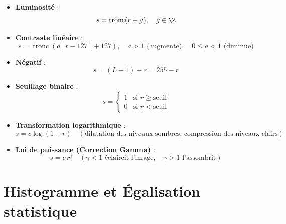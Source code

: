 \begin{proposition}
    \begin{itemize}
        \item \textbf{Luminosité} :
            \begin{equation}
                s = \operatorname{tronc}(r + g), \quad g \in \Z
            \end{equation}
        \item \textbf{Contraste linéaire} :
            \begin{equation}
                s = \operatorname{tronc}(a [r - 127] + 127), \quad a > 1 \text{ (augmente)}, \quad 0 \leqslant a < 1 \text{ (diminue)}
            \end{equation}
        \item \textbf{Négatif} :
            \begin{equation}
                s = (L - 1) - r = 255 - r
            \end{equation}
        \item \textbf{Seuillage binaire} :
            \begin{equation}
                s = \begin{cases} 1 & \text{si } r \geqslant \text{seuil} \\ 0 & \text{si } r < \text{seuil} \end{cases}
            \end{equation}
        \item \textbf{Transformation logarithmique} :
            \begin{equation}
                s = c \log(1 + r) \quad (\text{dilatation des niveaux sombres, compression des niveaux clairs})
            \end{equation}
        \item \textbf{Loi de puissance (Correction Gamma)} :
            \begin{equation}
                s = c \, r^\gamma \quad (\gamma < 1 \text{ éclaircit l'image}, \quad \gamma > 1 \text{ l'assombrit})
            \end{equation}
    \end{itemize}
\end{proposition}


\section{Histogramme et Égalisation statistique}

